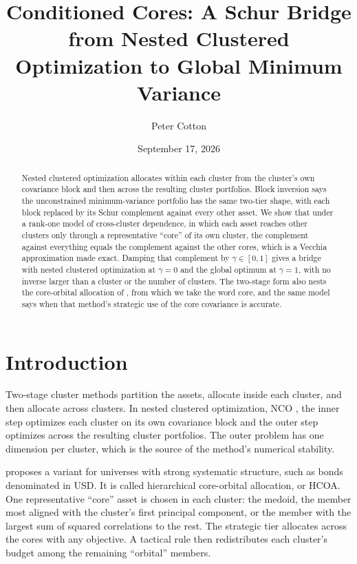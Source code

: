\documentclass[11pt]{article}
\title{Conditioned Cores: A Schur Bridge from Nested Clustered Optimization
to Global Minimum Variance}
\author{Peter Cotton}
\date{September 17, 2026}
\begin{document}
\maketitle

\begin{abstract}
Nested clustered optimization allocates within each cluster from the
cluster's own covariance block and then across the resulting cluster
portfolios. Block inversion says the unconstrained minimum-variance
portfolio has the same two-tier shape, with each block replaced by its Schur
complement against every other asset. We show that under a rank-one model of
cross-cluster dependence, in which each asset reaches other clusters only
through a representative ``core'' of its own cluster, the complement against
everything equals the complement against the other cores, which is a
Vecchia approximation made exact. Damping that
complement by $\gamma\in[0,1]$ gives a bridge with nested clustered
optimization at $\gamma=0$ and the global optimum at $\gamma=1$, with no
inverse larger than a cluster or the number of clusters. The two-stage form
also nests the core-orbital allocation of \textcite{hcoa2026}, from which we
take the word core, and the same model says when that method's strategic use
of the core covariance is accurate.
\end{abstract}

\section{Introduction}

Two-stage cluster methods partition the assets, allocate inside each
cluster, and then allocate across clusters. In nested clustered
optimization, NCO \parencite{lopezdeprado2020}, the inner step optimizes
each cluster on its own covariance block and the outer step optimizes across
the resulting cluster portfolios. The outer problem has one dimension per
cluster, which is the source of the method's numerical stability.

\textcite{hcoa2026} proposes a variant for universes with strong systematic
structure, such as bonds denominated in USD. It is called hierarchical
core-orbital allocation, or HCOA. One representative ``core'' asset is chosen in each
cluster: the medoid, the member most aligned with the cluster's first
principal component, or the member with the largest sum of squared
correlations to the rest. The strategic tier allocates across the cores
with any objective. A tactical rule then redistributes each cluster's
budget among the remaining ``orbital'' members.
\end{document}
